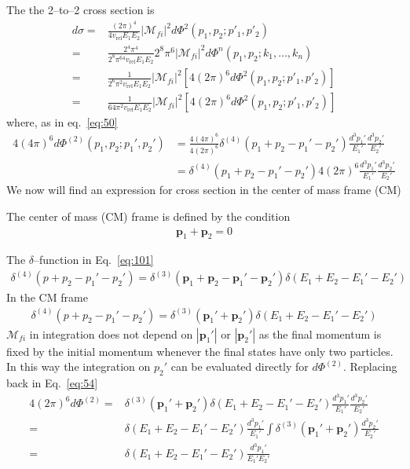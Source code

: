 The the 2--to--2 cross section is
\begin{align}
 \label{eq:54}
  d\sigma=&\frac{(2\pi)^4}{4v_{\text{rel}}E_1E_2}\left|\mathcal{M}_{fi}\right|^2
d\Phi^{2}(p_1,p_2;p'_1,p'_2)\nonumber\\
=&\frac{2^4\pi^4}{2^{8}\pi^64v_{\text{rel}}E_1E_2}2^{8}\pi^6\left|\mathcal{M}_{fi}\right|^2
d\Phi^{n}(p_1,p_2;k_1,\ldots,k_n)\nonumber\\
=&\frac{1}{2^{6}\pi^2v_{\text{rel}}E_1E_2}\left|\mathcal{M}_{fi}\right|^2
\left[4(2\pi)^6d\Phi^{2}(p_1,p_2;p'_1,p'_2)\right]\nonumber\\
=&\frac{1}{64\pi^2v_{\text{rel}}E_1E_2}\left|\mathcal{M}_{fi}\right|^2
\left[4(2\pi)^6d\Phi^{2}(p_1,p_2;p'_1,p'_2)\right]
\end{align}
where, as in eq.~\eqref{eq:50}
\begin{align}
4(4\pi)^6d\Phi^{(2)}(p_1,p_2;p_1',p_2')&= \frac{4(4\pi)^6}{4(2\pi)^6} \delta^{(4)}\left(p_1+p_2-p_1'-p_2'\right)
\frac{d^3p_1'}{E_{1}'}\frac{d^3p_2'}{E_{2}'}\nonumber\\
&=  \delta^{(4)}\left(p_1+p_2-p_1'-p_2'\right)4(2\pi)^6
\frac{d^3p_1'}{E_{1}'}\frac{d^3p_2'}{E_{2}'}
\end{align}
We now will find an expression for cross section in the center of mass frame (CM) 


The center of mass (CM) frame is defined by the condition
\begin{align}
  \label{eq:55}
  \mathbf{p}_1+\mathbf{p}_2=0
\end{align}


The $\delta$--function in Eq.~\eqref{eq:101}
\begin{align}
\label{eq:56}
  \delta^{(4)}(p+p_2-p_1'-p_2')=\delta^{(3)}(\mathbf{p}_1+\mathbf{p}_2-\mathbf{p}_1'-\mathbf{p}_2')
\delta(E_1+E_2-E_1'-E_2')
\end{align}
In the CM frame
\begin{align}
\label{eq:148}
  \delta^{(4)}(p+p_2-p_1'-p_2')=\delta^{(3)}(\mathbf{p}_1'+\mathbf{p}_2')
\delta(E_1+E_2-E_1'-E_2')
\end{align}
$\mathcal{M}_{fi}$ in integration does not depend on $|\mathbf{p}_1'|$ or $|\mathbf{p}_2'|$ as the final momentum is fixed by the initial momentum whenever the final states have only two particles. In this way the integration on $p_2'$ can be evaluated directly for $d\Phi^{(2)}$. Replacing back in Eq.~\eqref{eq:54}
\begin{align}
\label{eq:149}
  4(2\pi)^6d\Phi^{(2)}=&\delta^{(3)}(\mathbf{p}_1'+\mathbf{p}_2')\delta(E_1+E_2-E_1'-E_2')
\frac{d^3p_1'}{E_{1}'}\frac{d^3p_2'}{E_{2}'}\nonumber\\
 =&\delta(E_1+E_2-E_1'-E_2')
\frac{d^3p_1'}{E_{1}'}\int\delta^{(3)}(\mathbf{p}_1'+\mathbf{p}_2')\frac{d^3p_2'}{E_{2}'}\nonumber\\
=&\delta(E_1+E_2-E_1'-E_2')
\frac{d^3p_1'}{E_{1}'E_{2}'}
\end{align}


